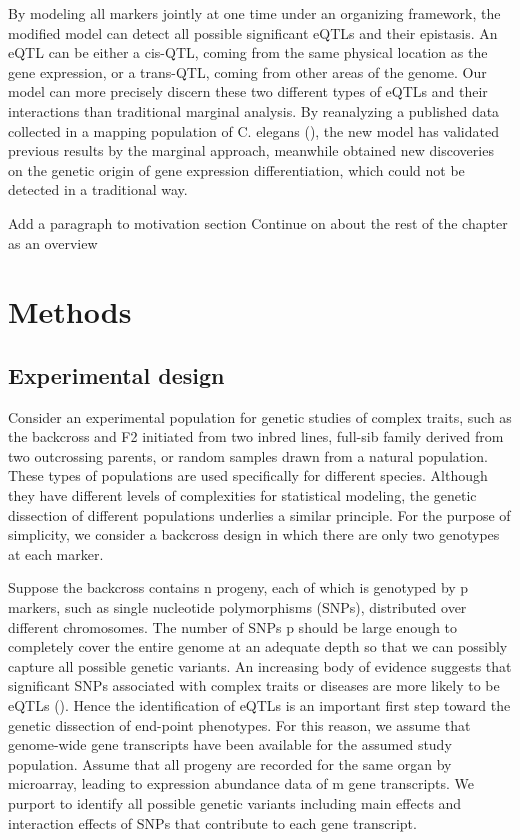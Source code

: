 \documentclass[]{book}
\theoremstyle{definition}
\theoremstyle{definition}
\theoremstyle{remark}
\begin{document}
By modeling all markers jointly at one time under an organizing
framework, the modified model can detect all possible significant eQTLs
and their epistasis. An eQTL can be either a cis-QTL, coming from the
same physical location as the gene expression, or a trans-QTL, coming
from other areas of the genome. Our model can more precisely discern
these two different types of eQTLs and their interactions than
traditional marginal analysis. By reanalyzing a published data collected
in a mapping population of C. elegans (\cite{rockman2010selection}), the
new model has validated previous results by the marginal approach,
meanwhile obtained new discoveries on the genetic origin of gene
expression differentiation, which could not be detected in a traditional
way.

Add a paragraph to motivation section Continue on about the rest of the
chapter as an overview

\section{Methods}\label{methods}

\subsection{Experimental design}\label{experimental-design}

Consider an experimental population for genetic studies of complex
traits, such as the backcross and F2 initiated from two inbred lines,
full-sib family derived from two outcrossing parents, or random samples
drawn from a natural population. These types of populations are used
specifically for different species. Although they have different levels
of complexities for statistical modeling, the genetic dissection of
different populations underlies a similar principle. For the purpose of
simplicity, we consider a backcross design in which there are only two
genotypes at each marker.

Suppose the backcross contains n progeny, each of which is genotyped by
p markers, such as single nucleotide polymorphisms (SNPs), distributed
over different chromosomes. The number of SNPs p should be large enough
to completely cover the entire genome at an adequate depth so that we
can possibly capture all possible genetic variants. An increasing body
of evidence suggests that significant SNPs associated with complex
traits or diseases are more likely to be eQTLs (\cite{li2013using}).
Hence the identification of eQTLs is an important first step toward the
genetic dissection of end-point phenotypes. For this reason, we assume
that genome-wide gene transcripts have been available for the assumed
study population. Assume that all progeny are recorded for the same
organ by microarray, leading to expression abundance data of m gene
transcripts. We purport to identify all possible genetic variants
including main effects and interaction effects of SNPs that contribute
to each gene transcript.
\end{document}
